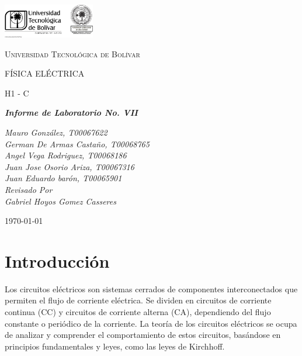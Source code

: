 \documentclass[twocolumn, 12pt]{article}
\begin{document}
\begin{titlepage}
    \centering
    \includegraphics[width=0.3\textwidth]{Images/logo_utb.png}\par\vspace{1cm}
    {\scshape\LARGE Universidad Tecnológica de Bolívar \par}
    \vspace{1cm}

    {\scshape\Large FÍSICA ELÉCTRICA \par}
    \vspace{.2cm}

    {\scshape\Large H1 - C \par}
    \vspace{1cm}
    \slshape {\Large \bfseries{}Informe de Laboratorio No. VII\\}
    \vspace{1cm}

    \slshape {\itshape{} Mauro González, T00067622 \\}
    \slshape {\itshape{} German De Armas Castaño, T00068765 \\}
    \slshape {\itshape{} Angel Vega Rodriguez, T00068186 \\}
    \slshape {\itshape{} Juan Jose Osorio Ariza, T00067316 \\}
    \slshape {\itshape{} Juan Eduardo barón, T00065901 \\}
    \vfill
    Revisado Por \\
    Gabriel Hoyos Gomez Casseres\\
    {\large \today\par}
\end{titlepage}

\section{Introducción}

Los circuitos eléctricos son sistemas cerrados de
componentes interconectados que permiten el flujo de
corriente eléctrica. Se dividen en circuitos de corriente
continua (CC) y circuitos de corriente alterna (CA),
dependiendo del flujo constante o periódico de la
corriente. La teoría de los circuitos eléctricos se ocupa
de analizar y comprender el comportamiento de estos
circuitos, basándose en principios fundamentales y leyes,
como las leyes de Kirchhoff.
\end{document}
